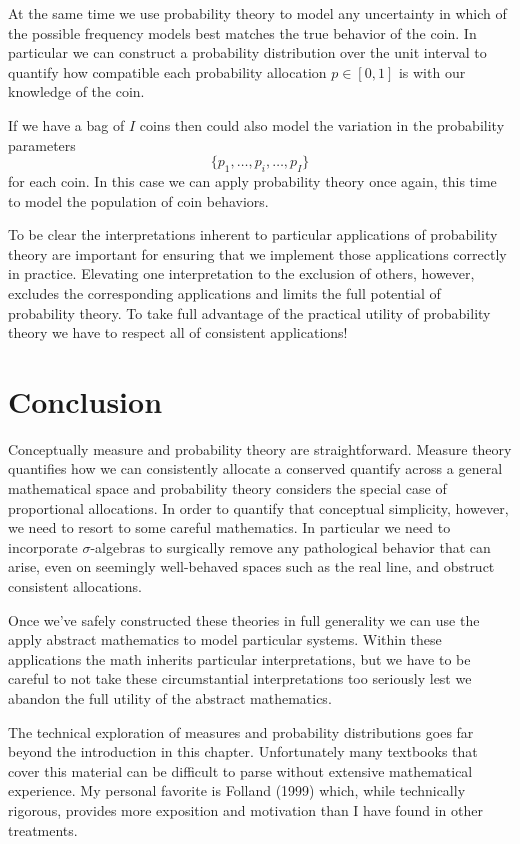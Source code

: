\documentclass[
  letterpaper,
  DIV=11,
  numbers=noendperiod]{scrartcl}
\begin{document}
At the same time we use probability theory to model any uncertainty in
which of the possible frequency models best matches the true behavior of
the coin. In particular we can construct a probability distribution over
the unit interval to quantify how compatible each probability allocation
\(p \in [0, 1]\) is with our knowledge of the coin.

If we have a bag of \(I\) coins then could also model the variation in
the probability parameters \[
\{ p_{1}, \ldots, p_{i}, \ldots, p_{I} \}
\] for each coin. In this case we can apply probability theory once
again, this time to model the population of coin behaviors.

To be clear the interpretations inherent to particular applications of
probability theory are important for ensuring that we implement those
applications correctly in practice. Elevating one interpretation to the
exclusion of others, however, excludes the corresponding applications
and limits the full potential of probability theory. To take full
advantage of the practical utility of probability theory we have to
respect all of consistent applications!

\hypertarget{conclusion}{%
\section{Conclusion}\label{conclusion}}

Conceptually measure and probability theory are straightforward. Measure
theory quantifies how we can consistently allocate a conserved quantify
across a general mathematical space and probability theory considers the
special case of proportional allocations. In order to quantify that
conceptual simplicity, however, we need to resort to some careful
mathematics. In particular we need to incorporate \(\sigma\)-algebras to
surgically remove any pathological behavior that can arise, even on
seemingly well-behaved spaces such as the real line, and obstruct
consistent allocations.

Once we've safely constructed these theories in full generality we can
use the apply abstract mathematics to model particular systems. Within
these applications the math inherits particular interpretations, but we
have to be careful to not take these circumstantial interpretations too
seriously lest we abandon the full utility of the abstract mathematics.

The technical exploration of measures and probability distributions goes
far beyond the introduction in this chapter. Unfortunately many
textbooks that cover this material can be difficult to parse without
extensive mathematical experience. My personal favorite is Folland
(1999) which, while technically rigorous, provides more exposition and
motivation than I have found in other treatments.
\end{document}
